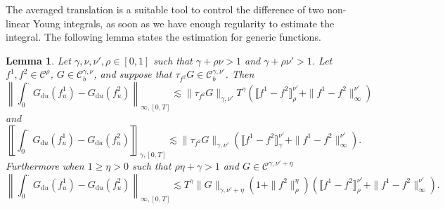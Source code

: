 \documentclass[a4paper,11pt]{article}
\newcommand{\mathd}{\mathrm{d}}
\newtheorem{lemma}[theorem]{Lemma}
\newcommand{\CC}{\mathscr C}
\begin{document}
The averaged translation is a suitable tool to control the difference of two
non-linear Young integrals, as soon as we have enough regularity to estimate
the integral. The following lemma states the estimation for generic functions.

\begin{lemma}
  Let $\gamma , \nu , \nu' , \rho \in [ 0,1 ]$ such that $\gamma + \rho \nu
  >1$ and $\gamma + \rho \nu' >1$. Let $f^{1} ,f^{2} \in \CC^{\rho}$, $G \in
  \CC_{b}^{\gamma , \nu}$, and suppose that $\tau_{f^{2}} G \in
  \CC_{b}^{\gamma , \nu'}$. Then
  \[ \left\| \int_{0}^{.} G_{\mathd u} ( f^{1}_{u} ) -G_{\mathd u} ( f^{2}_{u}
     ) \right\|_{\infty , [ 0,T ]} \lesssim \| \tau_{f^{2}} G \|_{\gamma ,
     \nu'} T^{\gamma} ( \llbracket f^{1} -f^{2} \rrbracket^{\nu'}_{\rho} + \|
     f^{1} -f^{2} \|^{\nu'}_{\infty} ) \]
  and
  \[ \left\llbracket \int_{0}^{.} G_{\mathd u} ( f^{1}_{u} ) -G_{\mathd u} (
     f^{2}_{u} ) \right\rrbracket_{\gamma , [ 0,T ]} \lesssim \| \tau_{f^{2}}
     G \|_{\gamma , \nu'} ( \llbracket f^{1} -f^{2} \rrbracket^{\nu'}_{\gamma}
     + \| f^{1} -f^{2} \|^{\nu'}_{\infty} ) . \]
  Furthermore when $1 \geqslant \eta >0$ such that $\rho \eta + \gamma >1$ and
  $G \in \CC^{\gamma , \nu' + \eta}$
  \[ \left\| \int_{0}^{.} G_{\mathd u} ( f^{1}_{u} ) -G_{\mathd u} ( f^{2}_{u}
     ) \right\|_{\infty , [ 0,T ]} \lesssim T^{\gamma} \| G \|_{\gamma , \nu'
     + \eta} ( 1+ \| f^{2} \|^{\eta}_{\rho} ) ( \llbracket f^{1} -f^{2}
     \rrbracket^{\nu'}_{\rho} + \| f^{1} -f^{2} \|^{\nu'}_{\infty} ) . \]
\end{lemma}
\end{document}
